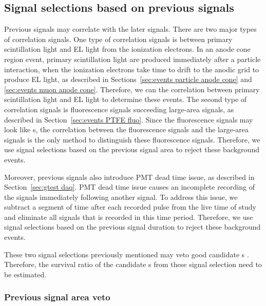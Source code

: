 \subsection{Signal selections based on previous signals}
\label{sec:uncor}
Previous signals may correlate with the later signals. There are two major types of correlation signals.  One type of correlation signals is between primary scintillation light and EL light from the ionization electrons. In an anode cone region event, primary scintillation light are produced immediately after a particle interaction, when the ionization electrons take time to drift to the anodic grid to produce EL light, as described in Sections~\ref{sec:events particle anode cone} and \ref{sec:events muon anode cone}. Therefore, we can the correlation between primary scintillation light and EL light to determine these events. The second type of correlation signals is fluorescence signals succeeding large-area signals, as described in Section~\ref{sec:events PTFE fluo}. Since the fluorescence signals may look like \ees s, the correlation between the fluorescence signals and the large-area signals is the only method to distinguish these fluorescence signals. Therefore, we use signal selections based on the previous signal area to reject these background events.

Moreover, previous signals also introduce PMT dead time issue, as described in Section~\ref{sec:gtest daq}. PMT dead time issue causes an incomplete recording of the signals immediately following another signal. To address this issue, we subtract a segment of time after each recorded pulse from the live time of study and eliminate all signals that is recorded in this time period. Therefore, we use signal selections based on the previous signal duration to reject these background events.

These two signal selections previously mentioned may veto good candidate \ees s . Therefore, the survival ratio of the candidate \ees s from these signal selection need to be estimated.


\subsubsection{Previous signal area veto}

